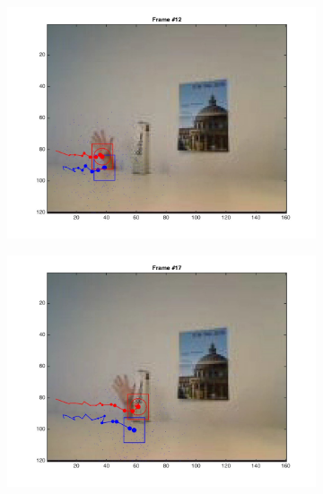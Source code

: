 \documentclass{ethz_report}
\begin{document}
\begin{figure}[H]
\begin{subfigure}[b]{.25\textwidth}
        \includegraphics[width=1\linewidth]{images/video2_model_11}
    \end{subfigure}%
    \begin{subfigure}[b]{.25\textwidth}
        \centering
        \includegraphics[width=1\linewidth]{images/video2_model_16}
    \end{subfigure}
    \begin{subfigure}[b]{.25\textwidth}
        \centering

\end{subfigure}
\end{figure}
\end{document}
